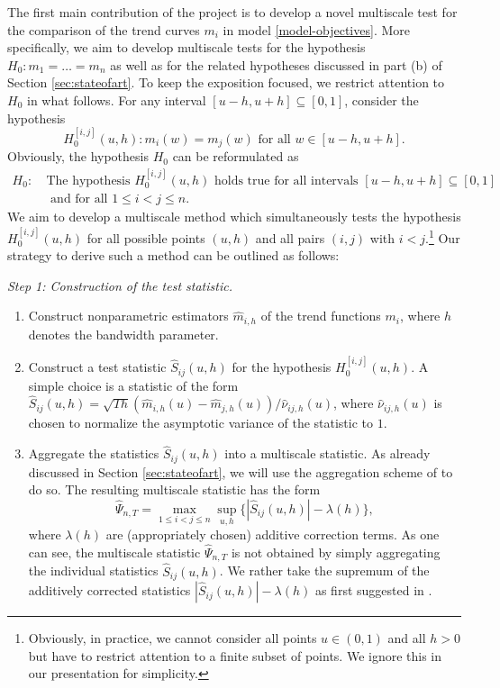 \documentclass[a4paper,12pt]{article}
\begin{document}
\noindent The first main contribution of the project is to develop a novel multiscale test for the comparison of the trend curves $m_i$ in model \eqref{model-objectives}. More specifically, we aim to develop multiscale tests for the hypothesis $H_0: m_1 = \ldots = m_n$ as well as for the related hypotheses discussed in part (b) of Section \ref{sec:stateofart}. To keep the exposition focused, we restrict attention to $H_0$ in what follows. For any interval $[u-h,u+h] \subseteq [0,1]$, consider the hypothesis
\[ H_0^{[i,j]}(u,h): m_i(w) = m_j(w) \text{ for all } w \in [u-h,u+h]. \] 
Obviously, the hypothesis $H_0$ can be reformulated as
\begin{align*}
H_0: \ & \text{The hypothesis } H_0^{[i,j]}(u,h) \text{ holds true for all intervals } [u-h,u+h] \subseteq [0,1] \\ & \text{ and for all } 1 \le i < j \le n. 
\end{align*} 
We aim to develop a multiscale method which simultaneously tests the hypothesis $H_0^{[i,j]}(u,h)$ for all possible points $(u,h)$ and all pairs $(i,j)$ with $i < j$.\footnote{Obviously, in practice, we cannot consider all points $u \in (0,1)$ and all $h > 0$ but have to restrict attention to a finite subset of points. We ignore this in our presentation for simplicity.} Our strategy to derive such a method can be outlined as follows:
\vspace{10pt}


\noindent \textit{Step 1: Construction of the test statistic.}
\begin{enumerate}[label=(\roman*),leftmargin=0.75cm]

\item Construct nonparametric estimators $\hat{m}_{i,h}$ of the trend functions $m_i$, where $h$ denotes the bandwidth parameter.   

\item Construct a test statistic $\hat{S}_{ij}(u,h)$ for the hypothesis $H_0^{[i,j]}(u,h)$. A simple choice is a statistic of the form $\hat{S}_{ij}(u,h) = \sqrt{Th} (\hat{m}_{i,h}(u) - \hat{m}_{j,h}(u)) / \hat{\nu}_{ij,h}(u)$, where $\hat{\nu}_{ij,h}(u)$ is chosen to normalize the asymptotic variance of the statistic to $1$. 

\item Aggregate the statistics $\hat{S}_{ij}(u,h)$ into a multiscale statistic. As already discussed in Section \ref{sec:stateofart}, we will use the aggregation scheme of \cite{DuembgenSpokoiny2001} to do so. The resulting multiscale statistic has the form 
\[ \hat{\Psi}_{n,T} = \max_{1 \le i < j \le n} \sup_{u,h} \big\{ |\hat{S}_{ij}(u,h)| - \lambda(h) \big\},  \]
where $\lambda(h)$ are (appropriately chosen) additive correction terms. As one can see, the multiscale statistic $\hat{\Psi}_{n,T}$ is not obtained by simply aggregating the individual statistics $\hat{S}_{ij}(u,h)$. We rather take the supremum of the additively corrected statistics $|\hat{S}_{ij}(u,h)| - \lambda(h)$ as first suggested in \cite{DuembgenSpokoiny2001}. 

\end{enumerate}
\end{document}
